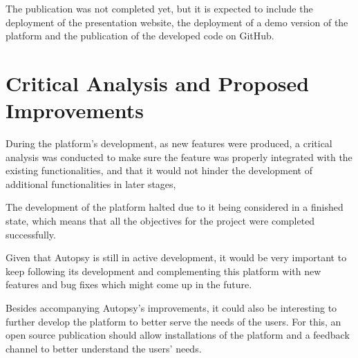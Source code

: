 The publication was not completed yet, but it is expected to include the deployment of the presentation website, the deployment of a demo version of the platform and
the publication of the developed code on GitHub.


\section{Critical Analysis and Proposed Improvements}

During the platform's development, as new features were produced, a critical analysis was conducted to make sure the feature was properly integrated with the existing functionalities, 
and that it would not hinder the development of additional functionalities in later stages,

The development of the platform halted due to it being considered in a finished state, which means that all the objectives for the project were completed successfully.

Given that Autopsy is still in active development, it would be very important to keep following its development and complementing this platform with new features and bug fixes which might come up in the future.

Besides accompanying Autopsy's improvements, it could also be interesting to further develop the platform to better serve the needs of the users.
For this, an open source publication should allow installations of the platform and a feedback channel to better understand the users' needs.
